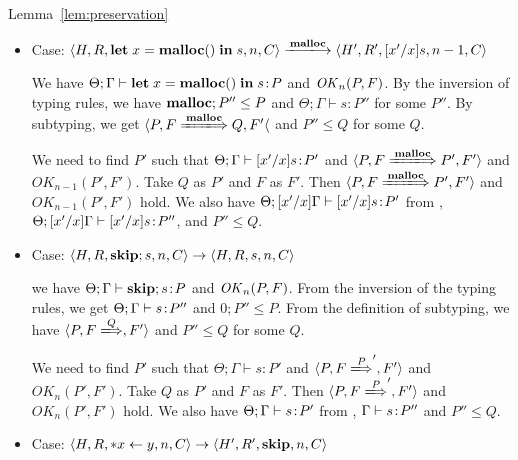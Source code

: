 \begin{pfof}{Lemma~\ref{lem:preservation}}
\begin{itemize}
   We need to find \(P'\) such that \( \langle P, F
   \xLongrightarrow{\Free} P', F' \rangle \), \(\Theta; \Gamma
   \vdash \SKIP \COL P'\), and \(\OK_{n+1}(P', F')\).  Take \(Q\) as
   \(P'\) and \(F\) as \(F'\).  Then, \( \langle P, F
   \xLongrightarrow{\Free} P', F'\) and \(OK_{n+1}(P', F')\) hold.  We
   also have \(\Theta; \Gamma \vdash \SKIP \COL P'\) from ,
   \(\TSKIP \le Q\).

\item Case: \( \langle H, R, \LET x = \MALLOC \IN s, n, C \rangle
  \xlongrightarrow{\Malloc} \langle H', R', [x'/x]s, n - 1, C \rangle \)

  We have \(\Theta; \Gamma \vdash \mathbf{let}\; x = \mathbf{malloc()}\; \mathbf{in}\; s \!:\! P\) and
  \(\mathit{OK}_{n}(P, F)\). By the inversion of typing rules, we have
  \(\mathbf{malloc};P'' \le P\) and \(\Theta; \Gamma \vdash s : P'' \) for
  some \(P''\). By subtyping, we get \( \langle P, F
  \xLongrightarrow{\Malloc} Q, F' \langle \) and \( P'' \le Q\) for
  some \(Q\).

  We need to find \(P'\) such that \(\Theta; \Gamma \vdash [x'/x]s\!:\!
  P'\) and \( \langle P, F \xLongrightarrow{\Malloc} P', F' \rangle\)
  and \(OK_{n-1}(P', F')\). Take \(Q\) as \(P'\) and \(F\) as \(F'\).
  Then \( \langle P, F \xLongrightarrow{\Malloc} P', F' \rangle\) and
  \(OK_{n-1}(P', F')\) hold. We also have \(\Theta;[x'/x]\Gamma \vdash
      [x'/x]s \!:\! P'\) from , \(\Theta;[x'/x]\Gamma \vdash
      [x'/x]s \!:\! P''\), and \(P'' \le Q\).
      
\item Case: \( \langle H, R, \mathbf{skip};s, n, C \rangle \rightarrow \langle
  H, R, s, n, C \rangle \)

  we have \(\Theta;\Gamma \vdash \mathbf{skip};s\!:\! P\) and \(\mathit{OK}_{n}(P,
  F)\). From the inversion of the typing rules, we get \(\Theta;
  \Gamma \vdash s\!:\! P''\) and \(0;P'' \le P\). From the definition
  of subtyping, we have \( \langle P, F \xLongrightarrow Q, F'
  \rangle\) and \(P'' \le Q\) for some \(Q\).

  We need to find \(P'\) such that \(\Theta; \Gamma \vdash s : P'\)
  and \(\langle P, F \xLongrightarrow P', F' \rangle\) and \(OK_n(P',
  F')\). Take \(Q\) as \(P'\) and \(F\) as \(F'\). Then \(\langle P, F
  \xLongrightarrow P', F' \rangle\) and \(OK_n(P', F')\) hold. We also
  have \(\Theta;\Gamma \vdash s\!:\! P'\) from , \(\Gamma
  \vdash s\!:\! P''\) and \(P'' \le Q\). 

\item Case: \( \langle H, R, *x \leftarrow y , n, C \rangle \rightarrow
  \langle H', R', \mathbf{skip}, n, C \rangle \)


\end{itemize}
\end{pfof}
